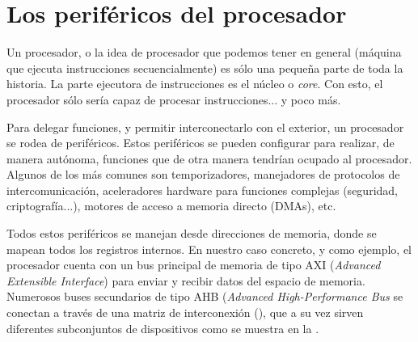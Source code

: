 \documentclass[../main.tex]{subfiles}
\begin{document}
\section{Los periféricos del procesador}

    Un procesador, o la idea de procesador que podemos tener en general (máquina que ejecuta instrucciones secuencialmente) es sólo una pequeña parte de toda la historia. La parte ejecutora de instrucciones es el núcleo o \emph{core}. Con esto, el procesador sólo sería capaz de procesar instrucciones... y poco más. 
    
    Para delegar funciones, y permitir interconectarlo con el exterior, un procesador se rodea de periféricos. Estos periféricos se pueden configurar para realizar, de manera autónoma, funciones que de otra manera tendrían ocupado al procesador. Algunos de los más comunes son temporizadores, manejadores de protocolos de intercomunicación, aceleradores hardware para funciones complejas (seguridad, criptografía...), motores de acceso a memoria directo (DMAs), etc.

    Todos estos periféricos se manejan desde direcciones de memoria, donde se mapean todos los registros internos. En nuestro caso concreto, y como ejemplo, el procesador \MCU{} cuenta con un bus principal de memoria de tipo AXI (\emph{Advanced Extensible Interface}) para enviar y recibir datos del espacio de memoria. Numerosos buses secundarios de tipo AHB (\emph{Advanced High-Performance Bus} se conectan a través de una matriz de interconexión (\REFMAN[2]), que a su vez sirven diferentes subconjuntos de dispositivos como se muestra en la .
\end{document}
